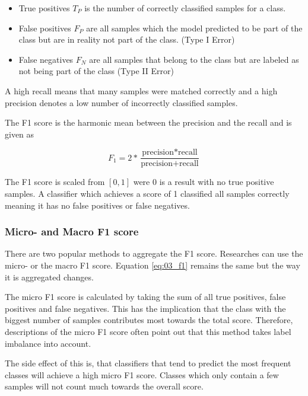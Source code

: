 \begin{itemize}
	\item True positives $T_P$ is the number of correctly classified samples for a class.
	\item False positives $F_P$ are all samples which the model predicted to be part of the class but are in reality not part of the class. {(Type I Error)}
	\item False negatives $F_N$ are all samples that belong to the class but are labeled as not being part of the class {(Type II Error)}
\end{itemize}

A high recall means that many samples were matched correctly and a high precision denotes a low number of incorrectly classified samples.
\medskip

The F1 score is the harmonic mean between the precision and the recall and is given as

\begin{equation}
	F_1 = 2 * \frac{\text{precision}*\text{recall}}{\text{precision}+\text{recall}}
\label{eq:03_f1}
\end{equation}

The F1 score is scaled from $[0, 1]$ were 0 is a result with no true positive samples. A classifier which achieves a score of 1 classified all samples correctly meaning it has no false positives or false negatives.

\subsubsection*{Micro- and Macro F1 score}

There are two popular methods to aggregate the F1 score. Researches can use the micro- or the macro F1 score. Equation \ref{eq:03_f1} remains the same but the way it is aggregated changes. 
\medskip

The micro F1 score is calculated by taking the sum of all true positives, false positives and false negatives. This has the implication that the class with the biggest number of samples contributes most towards the total score. Therefore, descriptions of the micro F1 score often point out that this method takes label imbalance into account. 

The side effect of this is, that classifiers that tend to predict the most frequent classes will achieve a high micro F1 score. Classes which only contain a few samples will not count much towards the overall score.
\bigskip

